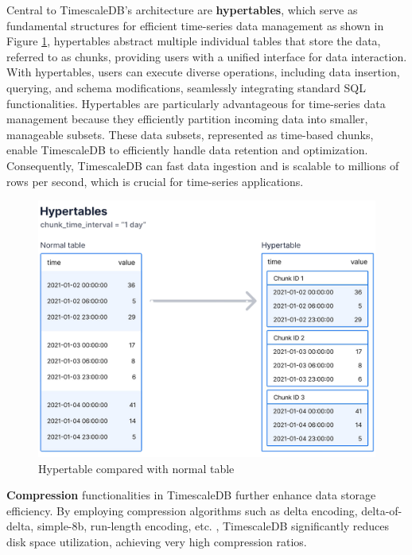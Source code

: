 Central to TimescaleDB's architecture are \textbf{hypertables}, which serve as fundamental structures for efficient time-series data management as shown in Figure \ref{fig:hypertables-chunks}, hypertables abstract multiple individual tables that store the data, referred to as chunks, providing users with a unified interface for data interaction. With hypertables, users can execute diverse operations, including data insertion, querying, and schema modifications, seamlessly integrating standard SQL functionalities. Hypertables are particularly advantageous for time-series data management because they efficiently partition incoming data into smaller, manageable subsets. These data subsets, represented as time-based chunks, enable TimescaleDB to efficiently handle data retention and optimization. Consequently, TimescaleDB can fast data ingestion and is scalable to millions of rows per second, which is crucial for time-series applications.

\begin{figure}[H]
    \centering
    \includegraphics[width=1\textwidth]{figures/hypertables-chunks.png}
    \caption{Hypertable compared with normal table \cite{hypertables}}
    \label{fig:hypertables-chunks}
\end{figure}

\textbf{Compression} functionalities in TimescaleDB further enhance data storage efficiency. By employing compression algorithms such as delta encoding, delta-of-delta, simple-8b, run-length encoding, etc. \cite{timescaledb-compress}, TimescaleDB significantly reduces disk space utilization, achieving very high compression ratios. 

